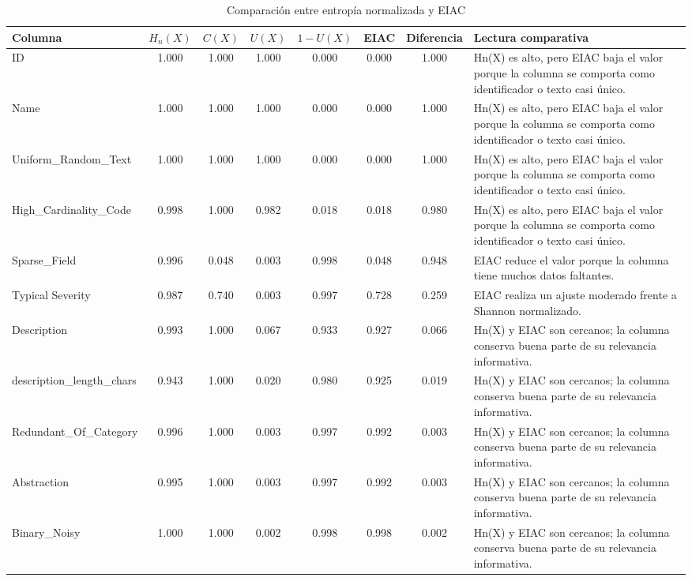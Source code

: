 \begin{table}[h]
\centering
\caption{Comparación entre entropía normalizada y EIAC}
\label{tab:comparacion-hn-eiac-20260624_102946}
\scriptsize
\begin{tabular}{|p{3cm}|c|c|c|c|c|c|p{5cm}|}
\hline
\textbf{Columna} & \textbf{\(H_n(X)\)} & \textbf{\(C(X)\)} & \textbf{\(U(X)\)} & \textbf{\(1-U(X)\)} & \textbf{EIAC} & \textbf{Diferencia} & \textbf{Lectura comparativa} \\
\hline
ID & 1.000 & 1.000 & 1.000 & 0.000 & 0.000 & 1.000 & Hn(X) es alto, pero EIAC baja el valor porque la columna se comporta como identificador o texto casi único. \\
\hline
Name & 1.000 & 1.000 & 1.000 & 0.000 & 0.000 & 1.000 & Hn(X) es alto, pero EIAC baja el valor porque la columna se comporta como identificador o texto casi único. \\
\hline
Uniform\_Random\_Text & 1.000 & 1.000 & 1.000 & 0.000 & 0.000 & 1.000 & Hn(X) es alto, pero EIAC baja el valor porque la columna se comporta como identificador o texto casi único. \\
\hline
High\_Cardinality\_Code & 0.998 & 1.000 & 0.982 & 0.018 & 0.018 & 0.980 & Hn(X) es alto, pero EIAC baja el valor porque la columna se comporta como identificador o texto casi único. \\
\hline
Sparse\_Field & 0.996 & 0.048 & 0.003 & 0.998 & 0.048 & 0.948 & EIAC reduce el valor porque la columna tiene muchos datos faltantes. \\
\hline
Typical Severity & 0.987 & 0.740 & 0.003 & 0.997 & 0.728 & 0.259 & EIAC realiza un ajuste moderado frente a Shannon normalizado. \\
\hline
Description & 0.993 & 1.000 & 0.067 & 0.933 & 0.927 & 0.066 & Hn(X) y EIAC son cercanos; la columna conserva buena parte de su relevancia informativa. \\
\hline
description\_length\_chars & 0.943 & 1.000 & 0.020 & 0.980 & 0.925 & 0.019 & Hn(X) y EIAC son cercanos; la columna conserva buena parte de su relevancia informativa. \\
\hline
Redundant\_Of\_Category & 0.996 & 1.000 & 0.003 & 0.997 & 0.992 & 0.003 & Hn(X) y EIAC son cercanos; la columna conserva buena parte de su relevancia informativa. \\
\hline
Abstraction & 0.995 & 1.000 & 0.003 & 0.997 & 0.992 & 0.003 & Hn(X) y EIAC son cercanos; la columna conserva buena parte de su relevancia informativa. \\
\hline
Binary\_Noisy & 1.000 & 1.000 & 0.002 & 0.998 & 0.998 & 0.002 & Hn(X) y EIAC son cercanos; la columna conserva buena parte de su relevancia informativa. \\

\end{tabular}
\end{table}
